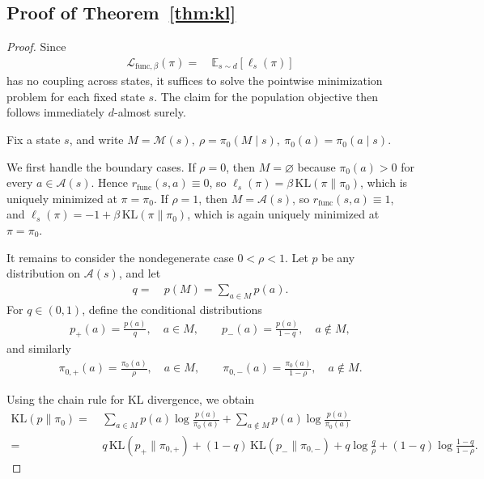 \subsection{Proof of Theorem~\ref{thm:kl}}\label{sec:proof-kl-proj}

\begin{proof}
Since
\begin{align*}
\mathcal L_{\mathrm{func},\beta}(\pi)= &~ \mathbb E_{s\sim d}[\ell_s(\pi)]
\end{align*}
has no coupling across states, it suffices to solve the pointwise minimization problem for each fixed state $s$. The claim for the population objective then follows immediately $d$-almost surely.

Fix a state $s$, and write $M= \mathcal M(s), ~\rho= \pi_0(M\mid s), ~\pi_0(a)= \pi_0(a\mid s)$.

We first handle the boundary cases. 
If $\rho=0$, then $M=\varnothing$ because $\pi_0(a)>0$ for every $a\in \mathcal{A}(s) $. Hence $r_{\mathrm{func}}(s,a)\equiv 0$, so $\ell_s(\pi)= \beta\, \mathrm{KL}(\pi\|\pi_0)$,
which is uniquely minimized at $\pi=\pi_0$. 
If $\rho=1$, then $M=\mathcal{A}(s) $, so $r_{\mathrm{func}}(s,a)\equiv 1$, and $\ell_s(\pi)= -1 + \beta\, \mathrm{KL}(\pi\|\pi_0)$,
which is again uniquely minimized at $\pi=\pi_0$.

It remains to consider the nondegenerate case $0<\rho<1$.
Let $p$ be any distribution on $\mathcal{A}(s) $, and let
\begin{align*}
q= &~ p(M)=\sum_{a\in M} p(a).
\end{align*}
For $q\in(0,1)$, define the conditional distributions
\begin{align*}
p_+(a)= \frac{p(a)}{q}, \quad a\in M, \qquad
p_-(a)= \frac{p(a)}{1-q}, \quad a\notin M,
\end{align*}
and similarly
\begin{align*}
\pi_{0,+}(a)= \frac{\pi_0(a)}{\rho}, \quad a\in M, \qquad
\pi_{0,-}(a)= \frac{\pi_0(a)}{1-\rho}, \quad a\notin M.
\end{align*}

Using the chain rule for KL divergence, we obtain
\begin{align*}
\mathrm{KL}(p\|\pi_0)
= &~ \sum_{a\in M} p(a)\log\frac{p(a)}{\pi_0(a)}
   + \sum_{a\notin M} p(a)\log\frac{p(a)}{\pi_0(a)} \\
= &~ q\,\mathrm{KL}(p_+\|\pi_{0,+})
   + (1-q)\,\mathrm{KL}(p_-\|\pi_{0,-}) + q\log\frac{q}{\rho}
   + (1-q)\log\frac{1-q}{1-\rho}.
\end{align*}


\end{proof}
